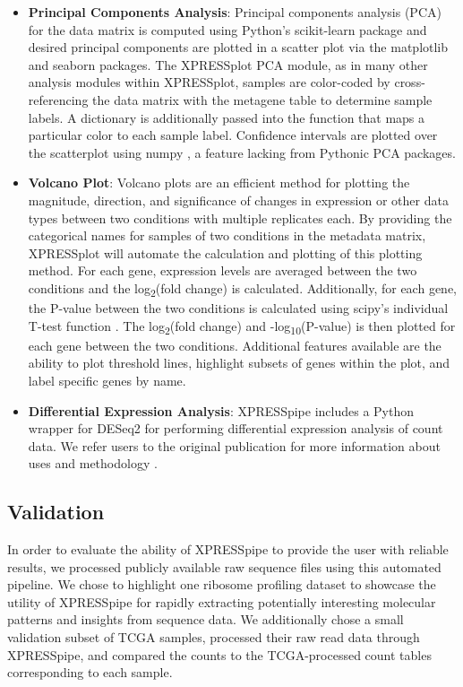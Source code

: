 \documentclass[11pt, a4paper, oneside]{article}
\begin{document}
\begin{itemize}
  \item \textbf{Principal Components Analysis}: Principal components analysis (PCA) for the data matrix is computed using Python's scikit-learn package \cite{scikit_learn} and desired principal components are plotted in a scatter plot via the matplotlib \cite{matplotlib} and seaborn \cite{seaborn} packages. The XPRESSplot PCA module, as in many other analysis modules within XPRESSplot, samples are color-coded by cross-referencing the data matrix with the metagene table to determine sample labels. A dictionary is additionally passed into the function that maps a particular color to each sample label. Confidence intervals are plotted over the scatterplot using numpy \cite{numpy1, numpy2}, a feature lacking from Pythonic PCA packages.

  \item \textbf{Volcano Plot}: Volcano plots are an efficient method for plotting the magnitude, direction, and significance of changes in expression or other data types between two conditions with multiple replicates each. By providing the categorical names for samples of two conditions in the metadata matrix, XPRESSplot will automate the calculation and plotting of this plotting method. For each gene, expression levels are averaged between the two conditions and the log\textsubscript{2}(fold change) is calculated. Additionally, for each gene, the P-value between the two conditions is calculated using scipy's individual T-test function \cite{scipy}. The log\textsubscript{2}(fold change) and -log\textsubscript{10}(P-value) is then plotted for each gene between the two conditions. Additional features available are the ability to plot threshold lines, highlight subsets of genes within the plot, and label specific genes by name.

  \item \textbf{Differential Expression Analysis}: XPRESSpipe includes a Python wrapper for DESeq2 for performing differential expression analysis of count data. We refer users to the original publication for more information about uses and methodology \cite{deseq2}.

\end{itemize}

\subsection{Validation}
In order to evaluate the ability of XPRESSpipe to provide the user with reliable results, we processed publicly available raw sequence files using this automated pipeline. We chose to highlight one ribosome profiling dataset to showcase the utility of XPRESSpipe for rapidly extracting potentially interesting molecular patterns and insights from sequence data. We additionally chose a small validation subset of TCGA samples, processed their raw read data through XPRESSpipe, and compared the counts to the TCGA-processed count tables corresponding to each sample.
\end{document}
